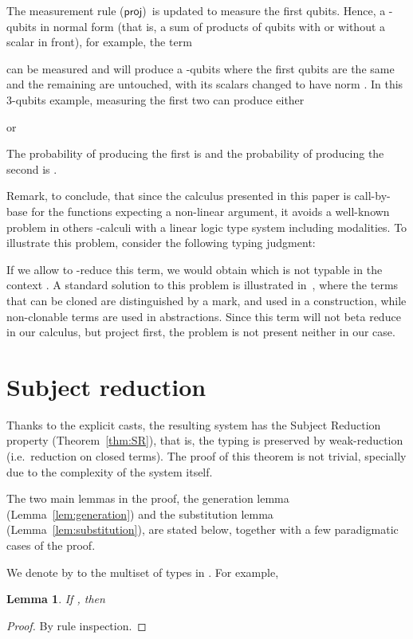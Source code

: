 \documentclass[preprint]{elsarticle}
\newtheorem{lemma}[theorem]{Lemma}
\newcommand\s[1]{\ensuremath{\mathsf{#1}}}
\newcommand\rproj{(\s{proj})}
\begin{document}
The measurement rule \rproj\ is updated to measure the first  qubits. Hence,
a -qubits in normal form (that is, a sum of products of qubits with or without
a scalar in front), for example, the term

can be measured and will produce a -qubits where the
first  qubits are the same and the remaining are untouched, with its scalars
changed to have norm . In this 3-qubits example, measuring the first two can
produce either

or

The
probability of producing the first is
 and the probability of producing the second is
.


Remark, to conclude, that since the calculus presented in this paper is
call-by-base for the functions expecting a non-linear argument, it avoids a
well-known problem in others -calculi with a linear logic type system
including modalities. To illustrate this problem, consider the following typing
judgment:

If we allow to -reduce this term, we would obtain  which is not typable in the context . A standard
solution to this problem is illustrated in~\cite{Barber96}, where the terms that
can be cloned are distinguished by a mark, and used in a 
construction, while non-clonable terms are used in  abstractions. Since
this term will not beta reduce in our calculus, but project first, the problem
is not present neither in our case.


\section{Subject reduction}\label{sec:SR}
Thanks to the explicit casts, the resulting system has the Subject Reduction
property (Theorem~\ref{thm:SR}), that is, the typing is preserved by
weak-reduction (i.e.~reduction on closed terms). The proof of this theorem is
not trivial, specially due to the complexity of the system itself.

The two main lemmas in the proof, the generation lemma (Lemma~\ref{lem:generation}) and the substitution
lemma (Lemma~\ref{lem:substitution}), are stated below, together with a few paradigmatic cases of the proof.

We denote by  to the multiset of types in . For example,



\begin{lemma}
  \label{lem:lqBn}
  If , then 
\end{lemma}
\begin{proof}
  By rule inspection.
\end{proof}
\end{document}
